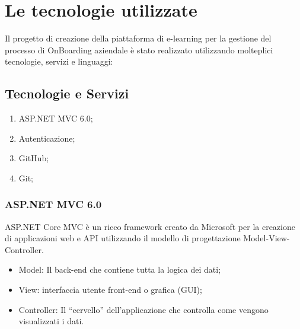 \chapter{Le tecnologie utilizzate}\label{chapter:formattazione}
%
Il progetto di creazione della piattaforma di e-learning per la gestione del processo di 
OnBoarding aziendale è stato realizzato utilizzando molteplici tecnologie, servizi e linguaggi:
%
\section{Tecnologie e Servizi}\label{sec:cap_sec_subsec}
\begin{enumerate}
    \item ASP.NET MVC 6.0;
    \item Autenticazione;
    \item GitHub;
    \item Git;
\end{enumerate}
\subsection{ASP.NET MVC 6.0}\label{sec:cap_sec_subsec}
ASP.NET Core MVC è un ricco framework creato da Microsoft per la creazione di applicazioni web e API 
utilizzando il modello di progettazione Model-View-Controller.
\begin{itemize}
    \item Model: Il back-end che contiene tutta la logica dei dati;
    \item View: interfaccia utente front-end o grafica (GUI);
    \item Controller: Il ``cervello'' dell'applicazione che controlla come vengono visualizzati i dati.
\end{itemize}

